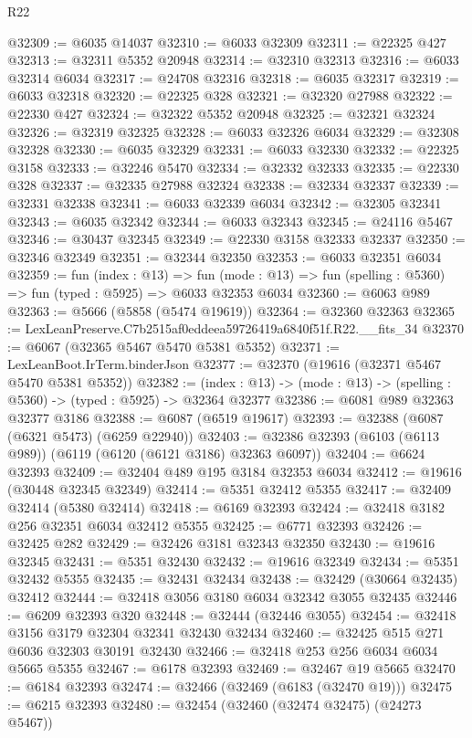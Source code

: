 \begin{lexlean}{R22}
\begin{coremodule}
@32309 := @6035 @14037
@32310 := @6033 @32309
@32311 := @22325 @427
@32313 := @32311 @5352 @20948
@32314 := @32310 @32313
@32316 := @6033 @32314 @6034
@32317 := @24708 @32316
@32318 := @6035 @32317
@32319 := @6033 @32318
@32320 := @22325 @328
@32321 := @32320 @27988
@32322 := @22330 @427
@32324 := @32322 @5352 @20948
@32325 := @32321 @32324
@32326 := @32319 @32325
@32328 := @6033 @32326 @6034
@32329 := @32308 @32328
@32330 := @6035 @32329
@32331 := @6033 @32330
@32332 := @22325 @3158
@32333 := @32246 @5470
@32334 := @32332 @32333
@32335 := @22330 @328
@32337 := @32335 @27988 @32324
@32338 := @32334 @32337
@32339 := @32331 @32338
@32341 := @6033 @32339 @6034
@32342 := @32305 @32341
@32343 := @6035 @32342
@32344 := @6033 @32343
@32345 := @24116 @5467
@32346 := @30437 @32345
@32349 := @22330 @3158 @32333 @32337
@32350 := @32346 @32349
@32351 := @32344 @32350
@32353 := @6033 @32351 @6034
@32359 := fun (index : @13) =>
  fun (mode : @13) => fun (spelling : @5360) => fun (typed : @5925) => @6033 @32353 @6034
@32360 := @6063 @989
@32363 := @5666 (@5858 (@5474 @19619))
@32364 := @32360 @32363
@32365 := LexLeanPreserve.C7b2515af0eddeea59726419a6840f51f.R22.__fits_34
@32370 := @6067 (@32365 @5467 @5470 @5381 @5352)
@32371 := LexLeanBoot.IrTerm.binderJson
@32377 := @32370 (@19616 (@32371 @5467 @5470 @5381 @5352))
@32382 := (index : @13) -> (mode : @13) -> (spelling : @5360) -> (typed : @5925) -> @32364 @32377
@32386 := @6081 @989 @32363 @32377 @3186
@32388 := @6087 (@6519 @19617)
@32393 := @32388 (@6087 (@6321 @5473) (@6259 @22940))
@32403 := @32386 @32393 (@6103 (@6113 @989)) (@6119 (@6120 (@6121 @3186) @32363 @6097))
@32404 := @6624 @32393
@32409 := @32404 @489 @195 @3184 @32353 @6034
@32412 := @19616 (@30448 @32345 @32349)
@32414 := @5351 @32412 @5355
@32417 := @32409 @32414 (@5380 @32414)
@32418 := @6169 @32393
@32424 := @32418 @3182 @256 @32351 @6034 @32412 @5355
@32425 := @6771 @32393
@32426 := @32425 @282
@32429 := @32426 @3181 @32343 @32350
@32430 := @19616 @32345
@32431 := @5351 @32430
@32432 := @19616 @32349
@32434 := @5351 @32432 @5355
@32435 := @32431 @32434
@32438 := @32429 (@30664 @32435) @32412
@32444 := @32418 @3056 @3180 @6034 @32342 @3055 @32435
@32446 := @6209 @32393 @320
@32448 := @32444 (@32446 @3055)
@32454 := @32418 @3156 @3179 @32304 @32341 @32430 @32434
@32460 := @32425 @515 @271 @6036 @32303 @30191 @32430
@32466 := @32418 @253 @256 @6034 @6034 @5665 @5355
@32467 := @6178 @32393
@32469 := @32467 @19 @5665
@32470 := @6184 @32393
@32474 := @32466 (@32469 (@6183 (@32470 @19)))
@32475 := @6215 @32393
@32480 := @32454 (@32460 (@32474 @32475) (@24273 @5467))

\end{coremodule}
\end{lexlean}
